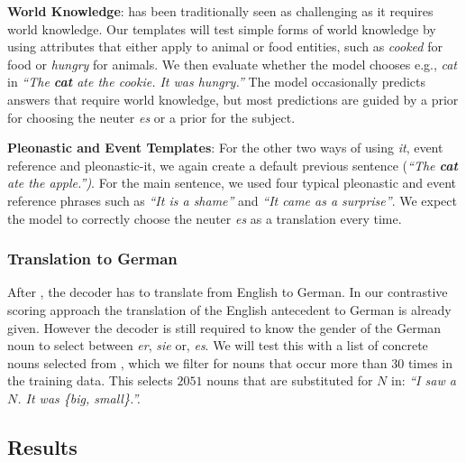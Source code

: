 \textbf{World Knowledge}: \coref{} has been traditionally seen as challenging as it requires  world knowledge.
%
Our templates will test simple forms of world knowledge by using attributes that either apply to animal or food entities, such as \textit{cooked} for food or \textit{hungry} for animals.
%
We then evaluate whether the model chooses e.g., \emph{cat} in \textit{``The \textbf{cat} ate the cookie. It was hungry.''}
%
The model occasionally predicts answers that require world knowledge, but most predictions are guided by a prior for choosing the neuter \emph{es} or a prior for the subject.


\textbf{Pleonastic and Event Templates}: For the other two ways of using \emph{it}, event reference and pleonastic-it, we again create a default previous sentence (\textit{``The \textbf{cat} ate the \emph{apple}.'')}. 
%
For the main sentence, we used four typical pleonastic and event reference phrases such as \textit{``It is a shame''} and \textit{``It came as a surprise''}.  
%
We expect the model to correctly choose the neuter \emph{es} as a translation every time.  

\subsubsection{Translation to German}
\label{gender_template}

After \coref{}, the decoder has to translate from English to German.
%
In  our contrastive scoring approach the translation of the English antecedent to German is already given.
%
However the decoder is still required to know the gender of the German noun to select between \emph{er}, \emph{sie} or, \emph{es}. 
%
We will test this with a list of concrete nouns selected from \citet{Brysbaert2014ConcretenessRF}, which we filter for nouns that occur more than $30$ times in the training data. 
%
This selects $2051$ nouns that are substituted for $N$ in: \textit{``I saw a $N$. It was \{big, small\}.''.}

\subsection{Results} \label{template_results}

